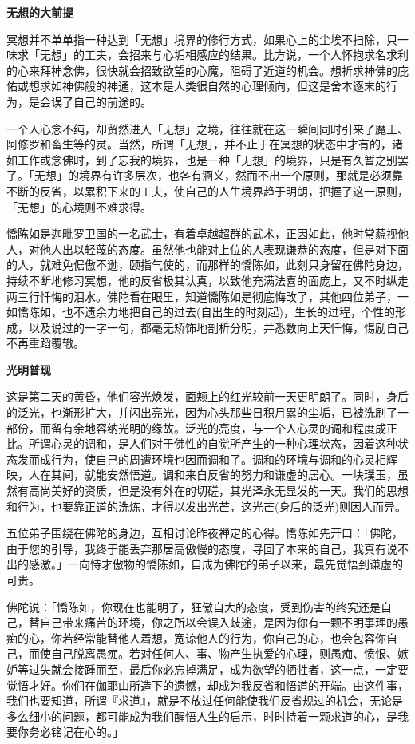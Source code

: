 \documentclass[twoside,openany]{book}
\newcommand{\mt}[1]{\textbullet \textbf{#1}}
\begin{document}
\mt{无想的大前提}

冥想并不单单指一种达到「无想」境界的修行方式，如果心上的尘埃不扫除，只一味求「无想」的工夫，会招来与心垢相感应的结果。比方说，一个人怀抱求名求利的心来拜神念佛，很快就会招致欲望的心魔，阻碍了近道的机会。想祈求神佛的庇佑或想求如神佛般的神通，这本是人类很自然的心理倾向，但这是舍本逐末的行为，是会误了自己的前途的。

一个人心念不纯，却贸然进入「无想」之境，往往就在这一瞬间同时引来了魔王、阿修罗和畜生等的灵。当然，所谓「无想」，并不止于在冥想的状态中才有的，诸如工作或念佛时，到了忘我的境界，也是一种「无想」的境界，只是有久暂之别罢了。「无想」的境界有许多层次，也各有涵义，然而不出一个原则，那就是必须靠不断的反省，以累积下来的工夫，使自己的人生境界趋于明朗，把握了这一原则，「无想」的心境则不难求得。

憍陈如是迦毗罗卫国的一名武士，有着卓越超群的武术，正因如此，他时常藐视他人，对他人出以轻蔑的态度。虽然他也能对上位的人表现谦恭的态度，但是对下面的人，就难免倨傲不逊，颐指气使的，而那样的憍陈如，此刻只身留在佛陀身边，持续不断地修习冥想，他的反省极其认真，以致他充满法喜的面庞上，又不时纵走两三行忏悔的泪水。佛陀看在眼里，知道憍陈如是彻底悔改了，其他四位弟子，一如憍陈如，也不遗余力地把自己的过去(自出生的时刻起)，生长的过程，个性的形成，以及说过的一字一句，都毫无矫饰地剖析分明，并悉数向上天忏悔，惕励自己不再重蹈覆辙。

\mt{光明普现}

这是第二天的黄昏，他们容光焕发，面颊上的红光较前一天更明朗了。同时，身后的泛光，也渐形扩大，并闪出亮光，因为心头那些日积月累的尘垢，已被洗刷了一部份，而留有余地容纳光明的缘故。泛光的亮度，与一个人心灵的调和程度成正比。所谓心灵的调和，是人们对于佛性的自觉所产生的一种心理状态，因着这种状态发而成行为，使自己的周遭环境也因而调和了。调和的环境与调和的心灵相辉映，人在其间，就能安然悟道。调和来自反省的努力和谦虚的居心。一块璞玉，虽然有高尚美好的资质，但是没有外在的切磋，其光泽永无显发的一天。我们的思想和行为，也要靠正道的洗炼，才得以发出光芒，这光芒(身后的泛光)则因人而异。

五位弟子围绕在佛陀的身边，互相讨论昨夜禅定的心得。憍陈如先开口：「佛陀，由于您的引导，我终于能丢弃那居高傲慢的态度，寻回了本来的自己，我真有说不出的感激。」一向恃才傲物的憍陈如，自成为佛陀的弟子以来，最先觉悟到谦虚的可贵。

佛陀说：「憍陈如，你现在也能明了，狂傲自大的态度，受到伤害的终究还是自己，替自己带来痛苦的环境，你之所以会误入歧途，是因为你有一颗不明事理的愚痴的心，你若经常能替他人着想，宽谅他人的行为，你自己的心，也会包容你自己，而使自己脱离愚痴。若对任何人、事、物产生执爱的心理，则愚痴、愤恨、嫉妒等过失就会接踵而至，最后你必忘掉满足，成为欲望的牺牲者，这一点，一定要觉悟才好。你们在伽耶山所造下的遗憾，却成为我反省和悟道的开端。由这件事，我们也要知道，所谓『求道』，就是不放过任何能使我们反省规过的机会，无论是多么细小的问题，都可能成为我们醒悟人生的启示，时时持着一颗求道的心，是我要你务必铭记在心的。」
\end{document}
